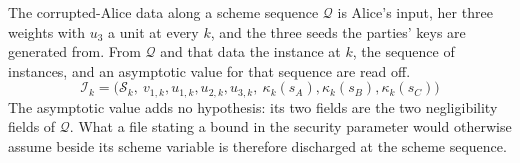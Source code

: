 \begin{definition}
  \label{def:mk_dsdp_instance_sequence}
  \rocqok
  The corrupted-Alice data along a scheme sequence $\mathcal{Q}$ is Alice's
  input, her three weights with $u_3$ a unit at every $k$, and the three seeds
  the parties' keys are generated from. From $\mathcal{Q}$ and that data the
  instance at $k$, the sequence of instances, and an asymptotic value for that
  sequence are read off.
  \[ \mathcal{I}_k = \big(\mathcal{S}_k,\
       v_{1,k}, u_{1,k}, u_{2,k}, u_{3,k},\
       \kappa_k(s_A), \kappa_k(s_B), \kappa_k(s_C)\big) \]
  The asymptotic value adds no hypothesis: its two fields are the two
  negligibility fields of $\mathcal{Q}$. What a file stating a bound in the
  security parameter would otherwise assume beside its scheme variable is
  therefore discharged at the scheme sequence.
\end{definition}

